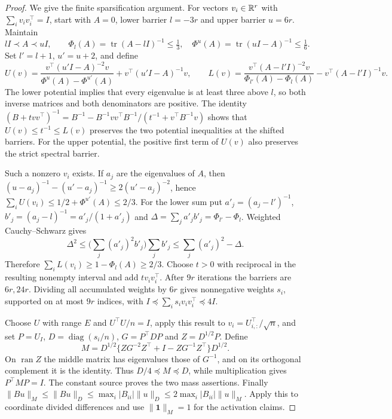 \begin{proof}
We give the finite sparsification argument. For vectors $v_i\in\mathbb R^r$
with $\sum_i v_iv_i^\top=I$, start with $A=0$, lower barrier $l=-3r$
and upper barrier $u=6r$. Maintain
\[
 lI\prec A\prec uI,\qquad
 \Phi_l(A)=\operatorname{tr}(A-lI)^{-1}\le\tfrac13,
 \quad\Phi^u(A)=\operatorname{tr}(uI-A)^{-1}\le\tfrac16.
\]
Set $l'=l+1$, $u'=u+2$, and define
\[
 U(v)=\frac{v^\top(u'I-A)^{-2}v}{\Phi^u(A)-\Phi^{u'}(A)}
       +v^\top(u'I-A)^{-1}v,\qquad
 L(v)=\frac{v^\top(A-l'I)^{-2}v}{\Phi_{l'}(A)-\Phi_l(A)}
       -v^\top(A-l'I)^{-1}v.
\]
The lower potential implies that every eigenvalue is at least three
above $l$, so both inverse matrices and both denominators are positive.
The identity
$(B+t vv^\top)^{-1}=B^{-1}-B^{-1}vv^\top B^{-1}/(t^{-1}+v^\top B^{-1}v)$
shows that $U(v)\le t^{-1}\le L(v)$ preserves the two potential
inequalities at the shifted barriers. For the upper potential, the
positive first term of $U(v)$ also preserves the strict spectral barrier.

Such a nonzero $v_i$ exists. If $a_j$ are the eigenvalues of $A$, then
$(u-a_j)^{-1}-(u'-a_j)^{-1}\ge2(u'-a_j)^{-2}$, hence
$\sum_iU(v_i)\le1/2+\Phi^{u'}(A)\le2/3$.
For the lower sum put $a'_j=(a_j-l')^{-1}$,
$b'_j=(a_j-l)^{-1}=a'_j/(1+a'_j)$ and
$\Delta=\sum_j a'_jb'_j=\Phi_{l'}-\Phi_l$.
Weighted Cauchy--Schwarz gives
\[
 \Delta^2\le\Big(\sum_j(a'_j)^2b'_j\Big)\sum_jb'_j
 \le\sum_j(a'_j)^2-\Delta.
\]
Therefore $\sum_iL(v_i)\ge1-\Phi_l(A)\ge2/3$.
Choose $t>0$ with reciprocal in the resulting nonempty interval and
add $t v_iv_i^\top$. After $9r$ iterations the barriers are $6r,24r$.
Dividing all accumulated weights by $6r$ gives nonnegative weights
$s_i$, supported on at most $9r$ indices, with
$I\preceq\sum_i s_i v_iv_i^\top\preceq4I$.

Choose $U$ with range $E$ and $U^\top U/n=I$, apply this result to
$v_i=U_{i,:}^\top/\sqrt n$, and set
$P=U_I$, $D=\operatorname{diag}(s_i/n)$, $G=P^\top DP$ and
$Z=D^{1/2}P$. Define
\begin{equation}
 M=D^{1/2}\{ZG^{-2}Z^\top+I-ZG^{-1}Z^\top\}D^{1/2}.
 \label{cp:metric}
\end{equation}
On $\operatorname{ran}Z$ the middle matrix has eigenvalues those of
$G^{-1}$, and on its orthogonal complement it is the identity.
Thus $D/4\preceq M\preceq D$, while multiplication gives $P^\top MP=I$.
The constant source proves the two mass assertions. Finally
$\|Bu\|_M\le\|Bu\|_D\le\max_i|B_{ii}|\|u\|_D\le
2\max_i|B_{ii}|\|u\|_M$. Apply this to coordinate divided differences
and use $\|\mathbf1\|_M=1$ for the activation claims.
\end{proof}

